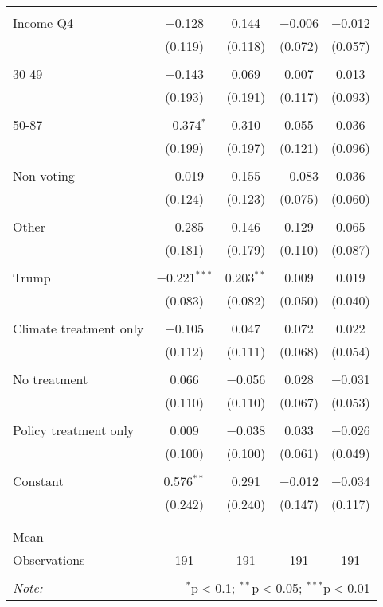 \begin{tabular}{@{\extracolsep{5pt}}lcccc}
  & & & & \\ 
 Income Q4 & $-$0.128 & 0.144 & $-$0.006 & $-$0.012 \\ 
  & (0.119) & (0.118) & (0.072) & (0.057) \\ 
  & & & & \\ 
 30-49 & $-$0.143 & 0.069 & 0.007 & 0.013 \\ 
  & (0.193) & (0.191) & (0.117) & (0.093) \\ 
  & & & & \\ 
 50-87 & $-$0.374$^{*}$ & 0.310 & 0.055 & 0.036 \\ 
  & (0.199) & (0.197) & (0.121) & (0.096) \\ 
  & & & & \\ 
 Non voting & $-$0.019 & 0.155 & $-$0.083 & 0.036 \\ 
  & (0.124) & (0.123) & (0.075) & (0.060) \\ 
  & & & & \\ 
 Other & $-$0.285 & 0.146 & 0.129 & 0.065 \\ 
  & (0.181) & (0.179) & (0.110) & (0.087) \\ 
  & & & & \\ 
 Trump & $-$0.221$^{***}$ & 0.203$^{**}$ & 0.009 & 0.019 \\ 
  & (0.083) & (0.082) & (0.050) & (0.040) \\ 
  & & & & \\ 
 Climate treatment only & $-$0.105 & 0.047 & 0.072 & 0.022 \\ 
  & (0.112) & (0.111) & (0.068) & (0.054) \\ 
  & & & & \\ 
 No treatment & 0.066 & $-$0.056 & 0.028 & $-$0.031 \\ 
  & (0.110) & (0.110) & (0.067) & (0.053) \\ 
  & & & & \\ 
 Policy treatment only & 0.009 & $-$0.038 & 0.033 & $-$0.026 \\ 
  & (0.100) & (0.100) & (0.061) & (0.049) \\ 
  & & & & \\ 
 Constant & 0.576$^{**}$ & 0.291 & $-$0.012 & $-$0.034 \\ 
  & (0.242) & (0.240) & (0.147) & (0.117) \\ 
  & & & & \\ 
\hline \\[-1.8ex] 
Mean &  &  &  &  \\ 
Observations & 191 & 191 & 191 & 191 \\ 
\hline 
\hline \\[-1.8ex] 
\textit{Note:}  & \multicolumn{4}{r}{$^{*}$p$<$0.1; $^{**}$p$<$0.05; $^{***}$p$<$0.01} \\ 
\end{tabular} 
